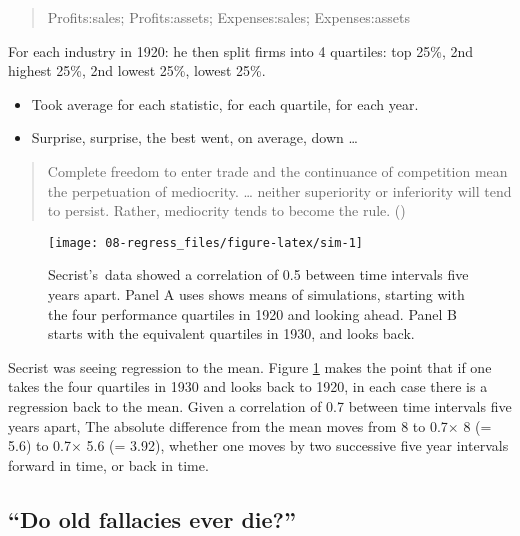 \documentclass[
  10ptls,
  b5paper]{book}
\providecommand{\tightlist}{%
  \setlength{\itemsep}{0pt}\setlength{\parskip}{0pt}}
\begin{document}
\begin{quote}
Profits:sales; Profits:assets; Expenses:sales; Expenses:assets
\end{quote}

For each industry in 1920: he then split firms into 4 quartiles: top 25\%, 2nd highest 25\%, 2nd lowest 25\%, lowest 25\%.

\begin{itemize}
\tightlist
\item
  Took average for each statistic, for each quartile, for each year.
\item
  Surprise, surprise, the best went, on average, down \ldots{}
\end{itemize}

\begin{quote}
Complete freedom to enter trade and the continuance of competition mean the perpetuation of mediocrity. \ldots{} neither superiority or inferiority will tend to persist. Rather, mediocrity tends to become the rule. ()
\end{quote}

\begin{figure}[H]

{\centering \texttt{[image: 08-regress\_files/figure-latex/sim-1]} 

}

\caption{Secrist's data showed a correlation of 0.5 between
time intervals five years apart.  Panel A uses shows means of simulations,
starting with the four performance quartiles in 1920 and looking ahead.
Panel B starts with the equivalent quartiles in 1930, and looks back.}\label{fig:sim}
\end{figure}

Secrist was seeing regression to the mean. Figure \ref{fig:sim} makes the point that if one takes the four quartiles in 1930 and looks back to 1920, in each case there is a regression back to the mean. Given a correlation of 0.7 between time intervals five years apart, The absolute difference from the mean moves from 8 to 0.7\(\times\) 8 (= 5.6) to 0.7\(\times\) 5.6 (= 3.92), whether one moves by two successive five year intervals forward in time, or back in time.

\subsection*{``Do old fallacies ever die?''}\label{do-old-fallacies-ever-die}
\end{document}
